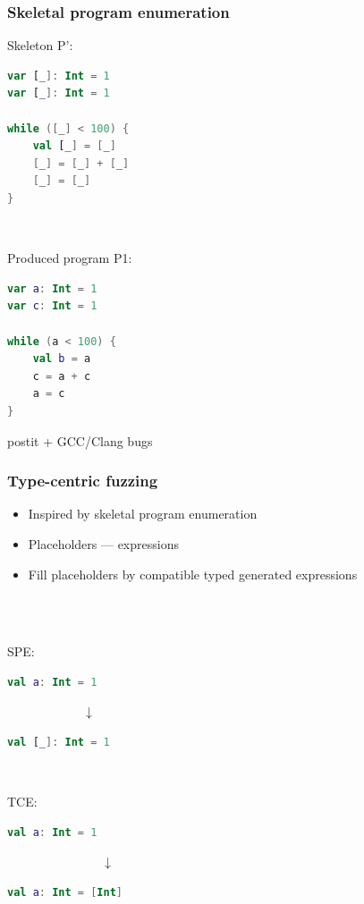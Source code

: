 \begin{frame}[fragile]
	\frametitle{Skeletal program enumeration}
\begin{minipage}{0.4\linewidth}
Skeleton P':
		\begin{lstlisting}[language=Kotlin]
var [_]: Int = 1
var [_]: Int = 1

while ([_] < 100) {
    val [_] = [_]
    [_] = [_] + [_]
    [_] = [_]
}
 \end{lstlisting}
	\end{minipage}
	\begin{minipage}{0.1\linewidth}
	\ \ 
	\end{minipage}
	\begin{minipage}{0.4\linewidth}
Produced program P1:
		\begin{lstlisting}[language=Kotlin]
var a: Int = 1
var c: Int = 1

while (a < 100) {
    val b = a
    c = a + c
    a = c
}
	\end{lstlisting}
\end{minipage}
	
	\begin{beamercolorbox}[sep=1em]{postit}
		+ GCC/Clang bugs
	\end{beamercolorbox}
\end{frame}



\begin{frame}[fragile]
	\frametitle{Type-centric fuzzing}
	\begin{itemize}
		\item Inspired by skeletal program enumeration
		\item Placeholders --- expressions
		\item Fill placeholders by compatible typed generated expressions
	\end{itemize}
\ \\ \ \\
\begin{minipage}{0.4\linewidth}
SPE:
\begin{lstlisting}[language=Kotlin]
val a: Int = 1
\end{lstlisting}
 \ \ \ \ \ \ \ \ \ \ \ \ $\downarrow$
\begin{lstlisting}[language=Kotlin]
val [_]: Int = 1
\end{lstlisting}
	\end{minipage}
	\begin{minipage}{0.1\linewidth}
	\ \ 
	\end{minipage}
	\begin{minipage}{0.4\linewidth}
TCE:
\begin{lstlisting}[language=Kotlin]
val a: Int = 1
\end{lstlisting}
 \ \ \ \ \ \ \ \ \ \ \ \ \ \ \ $\downarrow$
\begin{lstlisting}[language=Kotlin]
val a: Int = [Int]
\end{lstlisting}
\end{minipage}
\end{frame}


